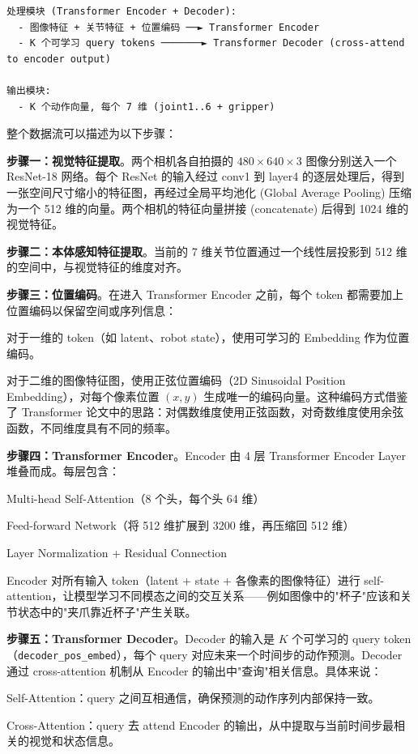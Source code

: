 \documentclass[UTF8,a4paper,11pt]{ctexart}
\begin{document}
{\begin{lstlisting}[language=text]
处理模块 (Transformer Encoder + Decoder):
  - 图像特征 + 关节特征 + 位置编码 ──► Transformer Encoder
  - K 个可学习 query tokens ───────► Transformer Decoder (cross-attend to encoder output)

输出模块:
  - K 个动作向量, 每个 7 维 (joint1..6 + gripper)
\end{lstlisting}

整个数据流可以描述为以下步骤：

\textbf{步骤一：视觉特征提取}。两个相机各自拍摄的 $480 \times 640 \times 3$ 图像分别送入一个 ResNet-18 网络。每个 ResNet 的输入经过 conv1 到 layer4 的逐层处理后，得到一张空间尺寸缩小的特征图，再经过全局平均池化 (Global Average Pooling) 压缩为一个 512 维的向量。两个相机的特征向量拼接 (concatenate) 后得到 1024 维的视觉特征。

\textbf{步骤二：本体感知特征提取}。当前的 7 维关节位置通过一个线性层投影到 512 维的空间中，与视觉特征的维度对齐。

\textbf{步骤三：位置编码}。在进入 Transformer Encoder 之前，每个 token 都需要加上位置编码以保留空间或序列信息：

\item 对于一维的 token（如 latent、robot state），使用可学习的 Embedding 作为位置编码。
\item 对于二维的图像特征图，使用正弦位置编码（2D Sinusoidal Position Embedding），对每个像素位置 $(x, y)$ 生成唯一的编码向量。这种编码方式借鉴了 Transformer 论文中的思路：对偶数维度使用正弦函数，对奇数维度使用余弦函数，不同维度具有不同的频率。

\textbf{步骤四：Transformer Encoder}。Encoder 由 4 层 Transformer Encoder Layer 堆叠而成。每层包含：
\item Multi-head Self-Attention（8 个头，每个头 64 维）
\item Feed-forward Network（将 512 维扩展到 3200 维，再压缩回 512 维）
\item Layer Normalization + Residual Connection

Encoder 对所有输入 token（latent + state + 各像素的图像特征）进行 self-attention，让模型学习不同模态之间的交互关系——例如图像中的"杯子"应该和关节状态中的"夹爪靠近杯子"产生关联。

\textbf{步骤五：Transformer Decoder}。Decoder 的输入是 $K$ 个可学习的 query token（\texttt{decoder_pos_embed}），每个 query 对应未来一个时间步的动作预测。Decoder 通过 cross-attention 机制从 Encoder 的输出中"查询"相关信息。具体来说：

\item Self-Attention：query 之间互相通信，确保预测的动作序列内部保持一致。
\item Cross-Attention：query 去 attend Encoder 的输出，从中提取与当前时间步最相关的视觉和状态信息。

}
\end{document}
